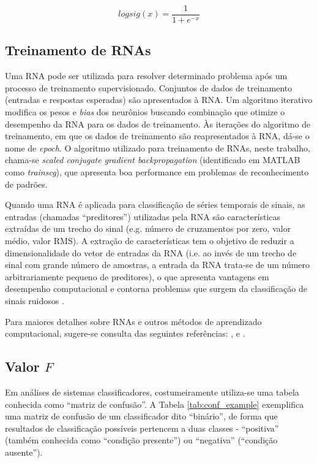 \begin{equation}
	\label{eq:logsig}
	logsig(x) = \frac{1}{1+e^{-x}}
\end{equation}

			\subsection{Treinamento de RNAs}

Uma RNA pode ser utilizada para resolver determinado problema após um processo de treinamento supervisionado. Conjuntos de dados de treinamento (entradas e respostas esperadas) são apresentados à RNA. Um algoritmo iterativo modifica os pesos e \emph{bias} dos neurônios buscando combinação que otimize o desempenho da RNA para os dados de treinamento. Às iterações do algoritmo de treinamento, em que os dados de treinamento são reapresentados à RNA, dá-se o nome de \emph{epoch}. O algoritmo utilizado para treinamento de RNAs, neste trabalho, chama-se \emph{scaled conjugate gradient backpropagation} \cite{Moller1993} (identificado em MATLAB como \emph{trainscg}), que apresenta boa performance em problemas de reconhecimento de padrões.

Quando uma RNA é aplicada para classificação de séries temporais de sinais, as entradas (chamadas ``preditores'') utilizadas pela RNA são características extraídas de um trecho do sinal (e.g. número de cruzamentos por zero, valor médio, valor RMS). A extração de características tem o objetivo de reduzir a dimensionalidade do vetor de entradas da RNA (i.e. ao invés de um trecho de sinal com grande número de amostras, a entrada da RNA trata-se de um número arbitrariamente pequeno de preditores), o que apresenta vantagens em desempenho computacional e contorna problemas que surgem da classificação de sinais ruidosos \cite{Kim2000}.

Para maiores detalhes sobre RNAs e outros métodos de aprendizado computacional, sugere-se consulta das seguintes referências: ,  e .

			\subsection{Valor $F$}
Em análises de sistemas classificadores, costumeiramente utiliza-se uma tabela conhecida como ``matriz de confusão''. A Tabela \ref{tab:conf_example} exemplifica uma matriz de confusão de um classificador dito ``binário'', de forma que resultados de classificação possíveis pertencem a duas classes - ``positiva'' (também conhecida como ``condição presente'') ou ``negativa'' (``condição ausente'').

